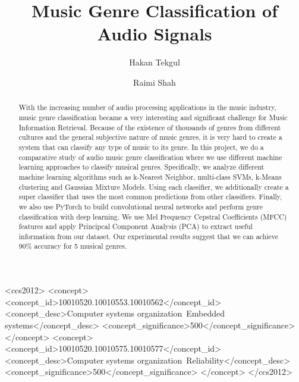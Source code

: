 \documentclass[sigconf]{acmart}
\begin{document}
\title{Music Genre Classification of Audio Signals}

\author{Hakan Tekgul}
\affiliation
{%
}

\author{Raimi Shah}




\begin{abstract}
With the increasing number of audio processing applications in the music industry, music genre classification became a very interesting and significant challenge for Music Information Retrieval. Because of the existence of thousands of genres from different cultures and the general subjective nature of music genres, it is very hard to create a system that can classify any type of music to its genre. In this project, we do a comparative study of audio music genre classification where we use different machine learning approaches to classify musical genres. Specifically, we analyze different machine learning algorithms such as k-Nearest Neighbor, multi-class SVMs, k-Means clustering and Gaussian Mixture Models. Using each classifier, we additionally create a super classifier that uses the most common predictions from other classifiers. Finally, we also use PyTorch to build convolutional neural networks and perform genre classification with deep learning. We use Mel Frequency Cepstral Coefficients (MFCC) features and apply Principcal Component Analysis (PCA) to extract useful information from our dataset. Our experimental results suggest that we can achieve 90\% accuracy for 5 musical genres. 
  

\end{abstract}

%
%

\begin{CCSXML}
<ccs2012>
<concept>
<concept_id>10010520.10010553.10010562</concept_id>
<concept_desc>Computer systems organization~Embedded systems</concept_desc>
<concept_significance>500</concept_significance>
</concept>
<concept>
<concept_id>10010520.10010575.10010577</concept_id>
<concept_desc>Computer systems organization~Reliability</concept_desc>
<concept_significance>500</concept_significance>
</concept>
</ccs2012>
\end{CCSXML}
\end{document}
